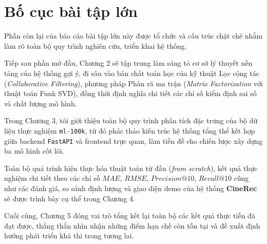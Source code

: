 \documentclass[../BTL.tex]{subfiles}
\begin{document}
\section{Bố cục  bài tập lớn}
\label{section:1.4}Phần còn lại của báo cáo bài tập lớn này được tổ chức và cấu trúc chặt chẽ nhằm làm rõ toàn bộ quy trình nghiên cứu, triển khai hệ thống. 

Tiếp sau phần mở đầu, Chương 2 sẽ tập trung làm sáng tỏ cơ sở lý thuyết nền tảng của hệ thống gợi ý, đi sâu vào bản chất toán học của kỹ thuật Lọc cộng tác (\textit{Collaborative Filtering}), phương pháp Phân rã ma trận (\textit{Matrix Factorization} với thuật toán Funk SVD), đồng thời định nghĩa chi tiết các chỉ số kiểm định sai số và chất lượng mô hình. 

Trong Chương 3, tôi giới thiệu toàn bộ quy trình phân tích đặc trưng của bộ dữ liệu thực nghiệm \texttt{ml-100k}, từ đó phác thảo kiến trúc hệ thống tổng thể kết hợp giữa backend \texttt{FastAPI} và frontend trực quan, làm tiền đề cho chiến lược xây dựng ba mô hình cốt lõi. 

Toàn bộ quá trình hiện thực hóa thuật toán từ đầu (\textit{from scratch}), kết quả thực nghiệm chi tiết theo các chỉ số $MAE$, $RMSE$, $Precision@10$, $Recall@10$ cũng như các đánh giá, so sánh định lượng và giao diện demo của hệ thống \textbf{CineRec} sẽ được trình bày cụ thể trong Chương 4. 

Cuối cùng, Chương 5 đóng vai trò tổng kết lại toàn bộ các kết quả thực tiễn đã đạt được, thẳng thắn nhìn nhận những điểm hạn chế còn tồn tại và đề xuất định hướng phát triển khả thi trong tương lai.
\end{document}

